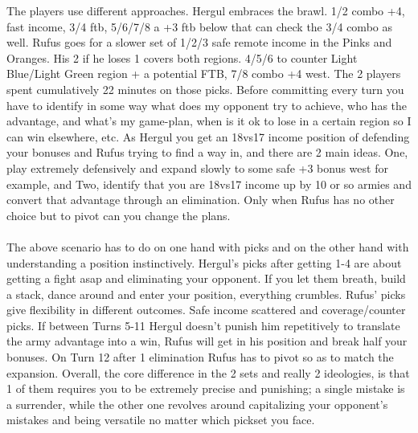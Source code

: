 The players use different approaches. Hergul embraces the brawl. 1/2 combo +4, fast income, 3/4 ftb, 5/6/7/8 a +3 ftb below that can check the 3/4 combo as well. Rufus goes for a slower set of 1/2/3 safe remote income in the Pinks and Oranges. His 2 if he loses 1 covers both regions. 4/5/6 to counter Light Blue/Light Green region + a potential FTB, 7/8 combo +4 west. The 2 players spent cumulatively 22 minutes on those picks. Before committing every turn you have to identify in some way what does my opponent try to achieve, who has the advantage, and what's my game-plan, when is it ok to lose in a certain region so I can win elsewhere, etc. As Hergul you get an 18vs17 income position of defending your bonuses and Rufus trying to find a way in, and there are 2 main ideas. One, play extremely defensively and expand slowly to some safe +3 bonus west for example, and Two, identify that you are 18vs17 income up by 10 or so armies and convert that advantage through an elimination. Only when Rufus has no other choice but to pivot can you change the plans.
\\
\\
The above scenario has to do on one hand with picks and on the other hand with understanding a position instinctively. Hergul's picks after getting 1-4 are about getting a fight asap and eliminating your opponent. If you let them breath, build a stack, dance around and enter your position, everything crumbles. Rufus' picks give flexibility in different outcomes. Safe income scattered and coverage/counter picks. If between Turns 5-11 Hergul doesn't punish him repetitively to translate the army advantage into a win, Rufus will get in his position and break half your bonuses. On Turn 12 after 1 elimination Rufus has to pivot so as to match the expansion. Overall, the core difference in the 2 sets and really 2 ideologies, is that 1 of them requires you to be extremely precise and punishing; a single mistake is a surrender, while the other one revolves around capitalizing your opponent's mistakes and being versatile no matter which pickset you face. 
\\
\\
